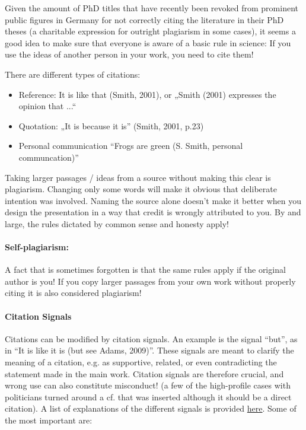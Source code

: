 \documentclass{tufte-book}
\begin{document}
Given the amount of PhD titles that have recently been revoked from prominent public figures in Germany for not correctly citing the literature in their PhD theses (a charitable expression for outright plagiarism in some cases), it seems a good idea to make sure that everyone is aware of a basic rule in science: If you use the ideas of another person in your work, you need to cite them!

There are different types of citations:

\begin{itemize}
\item Reference: It is like that (Smith, 2001), or „Smith (2001) expresses the opinion that ...“
\item Quotation: „It is because it is” (Smith, 2001, p.23)
\item Personal communication “Frogs are green (S. Smith, personal communcation)”
\end{itemize}

Taking larger passages / ideas from a source without making this clear is plagiarism. Changing only some words will make it obvious that deliberate intention was involved. Naming the source alone doesn’t make it better when you design the presentation in a way that credit is wrongly attributed to you. By and large, the rules dictated by common sense and honesty apply!

\paragraph{Self-plagiarism:} A fact that is sometimes forgotten is that the same rules apply if the original author is you! If you copy larger passages from your own work without properly citing it is also considered plagiarism! 

\paragraph{Citation Signals} Citations can be modified by citation signals. An example is the signal ``but'', as in ``It is like it is (but see Adams, 2009)”. These signals are meant to clarify the meaning of a citation, e.g. as supportive, related, or even contradicting the statement made in the main work. Citation signals are therefore crucial, and wrong use can also constitute misconduct! (a few of the high-profile cases with politicians turned around a cf. that was inserted although it should be a direct citation). A list of explanations of the different signals is provided \href{http://en.wikipedia.org/wiki/Citation_signal}{here}. Some of the most important are:
\end{document}

